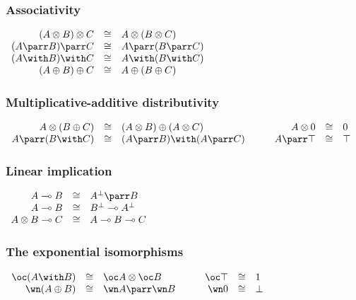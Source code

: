\subsubsection{Associativity}\label{associativity}

\(\begin{array}{rcl}
  (A\tens B)\tens C & \cong&  A\tens(B\tens C)\\
  (A\parr B)\parr C & \cong&  A\parr(B\parr C)\\
  (A\with B)\with C & \cong&  A\with(B\with C)\\
  (A\plus B)\plus C & \cong&  A\plus(B\plus C)\\
\end{array}\)

\subsubsection{Multiplicative-additive distributivity}\label{multiplicative-additive-distributivity}

\(\begin{array}{rclcrcl}
  A\tens(B\plus C) & \cong&  (A\tens B)\plus(A\tens C) & \quad& 
  A\tens\zero & \cong&  \zero\\
  A\parr(B\with C) & \cong&  (A\parr B)\with(A\parr C) & \quad& 
  A\parr\top & \cong&  \top\\
\end{array}\)

\subsubsection{Linear implication}\label{linear-implication}

\(\begin{array}{rclcrcl}
  A\limp B & \cong&  A\orth\parr B\\
  A\limp B & \cong&  B\orth\limp A\orth\\
  A\tens B \limp C & \cong&  A\limp B \limp C\\
\end{array}\)

\subsubsection{The exponential isomorphisms}\label{the-exponential-isomorphisms}

\(\begin{array}{rclcrcl}
  \oc(A\with B) & \cong&  \oc A\tens\oc B & \quad&  \oc\top & \cong&  \one\\
  \wn(A\plus B) & \cong&  \wn A\parr\wn B & \quad&  \wn\zero & \cong&  \bot\\
\end{array}\)

